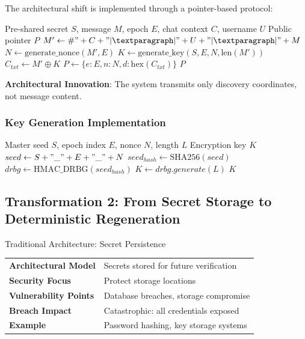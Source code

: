 \documentclass[11pt,a4paper]{article}
\begin{document}
The architectural shift is implemented through a pointer-based protocol:

\begin{algorithm}[H]
\caption{Pointer-Based Message Discovery}
\begin{algorithmic}[1]
\REQUIRE Pre-shared secret $S$, message $M$, epoch $E$, chat context $C$, username $U$
\ENSURE Public pointer $P$
\STATE $M' \gets \#" + C + "|¶|" + U + "|¶|" + M$ 
\STATE $N \gets \text{generate\_nonce}(M', E)$ 
\STATE $K \gets \text{generate\_key}(S, E, N, \text{len}(M'))$ 
\STATE $C_{txt} \gets M' \oplus K$ 
\STATE $P \gets \{e: E, n: N, d: \text{hex}(C_{txt})\}$ 
\RETURN $P$ 
\end{algorithmic}
\end{algorithm}

\textbf{Architectural Innovation}: The system transmits only discovery coordinates, not message content.

\subsubsection{Key Generation Implementation}

\begin{algorithm}[H]
\caption{Deterministic Key Generation}
\begin{algorithmic}[1]
\REQUIRE Master seed $S$, epoch index $E$, nonce $N$, length $L$
\ENSURE Encryption key $K$
\STATE $seed \gets S + "\_" + E + "\_" + N$ 
\STATE $seed_{hash} \gets \text{SHA256}(seed)$ 
\STATE $drbg \gets \text{HMAC\_DRBG}(seed_{hash})$ 
\STATE $K \gets drbg.generate(L)$ 
\RETURN $K$
\end{algorithmic}
\end{algorithm}

\subsection{Transformation 2: From Secret Storage to Deterministic Regeneration}

\begin{paradigmbox}{Traditional Architecture: Secret Persistence}
\begin{tabularx}{\textwidth}{lX}
\textbf{Architectural Model} & Secrets stored for future verification \\
\textbf{Security Focus} & Protect storage locations \\
\textbf{Vulnerability Points} & Database breaches, storage compromise \\
\textbf{Breach Impact} & Catastrophic: all credentials exposed \\
\textbf{Example} & Password hashing, key storage systems \\
\end{tabularx}
\end{paradigmbox}
\end{document}
